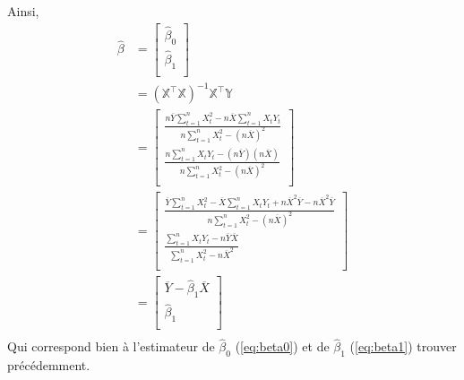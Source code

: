\documentclass[11pt,french]{report}
\begin{document}
Ainsi,
\begin{align*}
\hat{\beta} &= 
\begin{bmatrix} 
\hat{\beta}_0 \\
\hat{\beta}_1 \\
\end{bmatrix} \\
&= (\mathbb{X}^\intercal\mathbb{X})^{-1}\mathbb{X}^\intercal\mathbb{Y} \\
&= 
\begin{bmatrix} 
\frac{n \overline{Y} \sum_{t=1}^n X_t^2 - n \overline{X} \sum_{t=1}^n X_tY_t}{n \sum_{t=1}^n X_t^2 - (n \overline{X})^2} \\
\frac{n\sum_{t=1}^n X_tY_t - (n \overline{Y})(n \overline{X}) }{n \sum_{t=1}^n X_t^2 - (n \overline{X})^2} \\
\end{bmatrix} \\
&=
\begin{bmatrix} 
\frac{\overline{Y} \sum_{t=1}^n X_t^2 - \overline{X} \sum_{t=1}^n X_tY_t + n\overline{X}^2\overline{Y} - n\overline{X}^2\overline{Y}}{n \sum_{t=1}^n X_t^2 - (n \overline{X})^2} \\
\frac{\sum_{t=1}^n X_tY_t - n\overline{Y}\overline{X}}{\sum_{t=1}^n X_t^2 - n \overline{X}^2} \\
\end{bmatrix} \\
&=
\begin{bmatrix} 
\overline{Y} - \hat{\beta}_1\overline{X} \\
\hat{\beta}_1 \\
\end{bmatrix} \\
\end{align*}
Qui correspond bien à l'estimateur de $\hat{\beta}_0$ (\ref{eq:beta0}) et de $\hat{\beta}_1$ (\ref{eq:beta1}) trouver précédemment.
\end{document}
